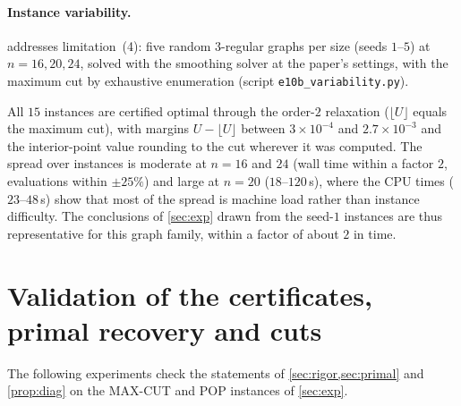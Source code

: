 \documentclass[a4paper,11pt]{article}
\newcommand{\fitbox}[1]{\sbox{\tabbox}{#1}\ifdim\wd\tabbox>\textwidth\resizebox{\textwidth}{!}{\usebox{\tabbox}}\else\usebox{\tabbox}\fi}
\theoremstyle{plain}
\theoremstyle{definition}
\theoremstyle{remark}
\begin{document}
\paragraph{Instance variability.}  addresses limitation~(4): five random $3$-regular graphs per size (seeds $1$--$5$) at $n=16,20,24$, solved with the smoothing solver at the paper's settings, with the maximum cut by exhaustive enumeration (script \texttt{e10b\_variability.py}).
\begin{table}[t]\centering\small
\fitbox{}
\caption{Variability over five random $3$-regular graphs per size (mean [min, max]). ``certified'': instances with $\lfloor U\rfloor=$ maximum cut. ``IPM'': Clarabel on the moment model (at $n=20$ only one of five instances finished within the $600$\,s cap; not attempted at $n=24$). CPU time at $n=16$ from a re-timed run.}\label{tab:e10b}
\end{table}
All $15$ instances are certified optimal through the order-$2$ relaxation ($\lfloor U\rfloor$ equals the maximum cut), with margins $U-\lfloor U\rfloor$ between $3\times10^{-4}$ and $2.7\times10^{-3}$ and the interior-point value rounding to the cut wherever it was computed. The spread over instances is moderate at $n=16$ and $24$ (wall time within a factor $2$, evaluations within $\pm25\%$) and large at $n=20$ ($18$--$120$\,s), where the CPU times ($23$--$48$\,s) show that most of the spread is machine load rather than instance difficulty. The conclusions of \cref{sec:exp} drawn from the seed-$1$ instances are thus representative for this graph family, within a factor of about $2$ in time.

\section{Validation of the certificates, primal recovery and cuts}\label{sec:validation}
The following experiments check the statements of \cref{sec:rigor,sec:primal} and \cref{prop:diag} on the MAX-CUT and POP instances of \cref{sec:exp}.
\end{document}
